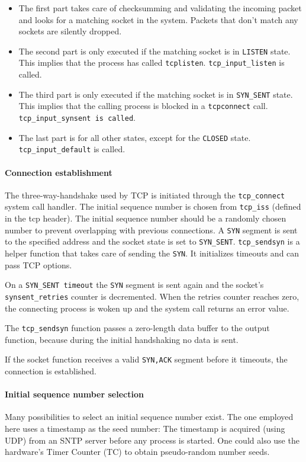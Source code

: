 \documentclass[11pt,twoside,abstract,notitlepage]{scrreprt}
\begin{document}
\begin{itemize}
	\item The first part takes care of checksumming and validating the incoming packet and looks for a matching socket in the system. Packets that don't match any sockets are silently dropped. 
	\item The second part is only executed if the matching socket is in \texttt{LISTEN} state. This implies that the process has called \texttt{tcplisten}. \texttt{tcp\_input\_listen} is called.
	\item The third part is only executed if the matching socket is in \texttt{SYN\_SENT} state. This implies that the calling process is blocked in a \texttt{tcpconnect} call. \texttt{tcp\_input\_synsent is called}.
	\item The last part is for all other states, except for the \texttt{CLOSED} state. \texttt{tcp\_input\_default} is called. 
\end{itemize}

\paragraph{Connection establishment}
The three-way-handshake used by TCP is initiated through the \texttt{tcp\_connect} system call handler. The initial sequence number is chosen from \texttt{tcp\_iss} (defined in the tcp header). The initial sequence number should be a randomly chosen number to prevent overlapping with previous connections. A \texttt{SYN} segment is sent to the specified address and the socket state is set to \texttt{SYN\_SENT}. \texttt{tcp\_sendsyn} is a helper function that takes care of sending the \texttt{SYN}. It initializes timeouts and can pass TCP options. 

On a \texttt{SYN\_SENT timeout} the \texttt{SYN} segment is sent again and the socket's \texttt{synsent\_retries} counter is decremented. When the retries counter reaches zero, the connecting process is woken up and the system call returns an error value. 

The \texttt{tcp\_sendsyn} function passes a zero-length data buffer to the output function, because during the initial handshaking no data is sent.

If the socket function receives a valid \texttt{SYN,ACK} segment before it timeouts, the connection is established. 

\paragraph{Initial sequence number selection} Many possibilities to select an initial sequence number exist. The one employed here uses a timestamp as the seed number: The timestamp is acquired (using UDP) from an SNTP server before any process is started. One could also use the hardware's Timer Counter (TC) to obtain pseudo-random number seeds. 
\end{document}
